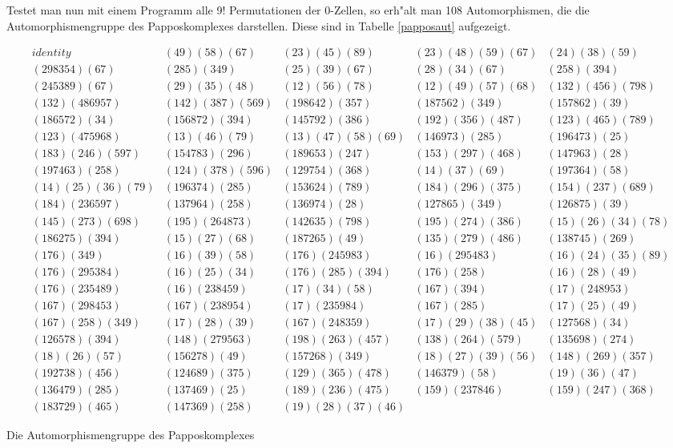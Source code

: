 Testet man nun mit einem Programm alle 9! Permutationen der 0-Zellen, so
erh"alt man 108 Automorphismen, die die Automorphismengruppe des Papposkomplexes
darstellen. Diese sind in Tabelle \ref{papposaut} aufgezeigt.

\begin{table}%
{\footnotesize
$$
\begin{array}{lllll}
identity&(49)(58)(67)&(23)(45)(89)&(23)(48)(59)(67)&(24)(38)(59)\\
(298354)(67)&(285)(349)&(25)(39)(67)&(28)(34)(67)&(258)(394)\\
(245389)(67)&(29)(35)(48)&(12)(56)(78)&(12)(49)(57)(68)&(132)(456)(798)\\
(132)(486957)&(142)(387)(569)&(198642)(357)&(187562)(349)&(157862)(39)\\
(186572)(34)&(156872)(394)&(145792)(386)&(192)(356)(487)&(123)(465)(789)\\
(123)(475968)&(13)(46)(79)&(13)(47)(58)(69)&(146973)(285)&(196473)(25)\\
(183)(246)(597)&(154783)(296)&(189653)(247)&(153)(297)(468)&(147963)(28)\\
(197463)(258)&(124)(378)(596)&(129754)(368)&(14)(37)(69)&(197364)(58)\\
(14)(25)(36)(79)&(196374)(285)&(153624)(789)&(184)(296)(375)&(154)(237)(689)\\
(184)(236597)&(137964)(258)&(136974)(28)&(127865)(349)&(126875)(39)\\
(145)(273)(698)&(195)(264873)&(142635)(798)&(195)(274)(386)&(15)(26)(34)(78)\\
(186275)(394)&(15)(27)(68)&(187265)(49)&(135)(279)(486)&(138745)(269)\\
(176)(349)&(16)(39)(58)&(176)(245983)&(16)(295483)&(16)(24)(35)(89)\\
(176)(295384)&(16)(25)(34)&(176)(285)(394)&(176)(258)&(16)(28)(49)\\
(176)(235489)&(16)(238459)&(17)(34)(58)&(167)(394)&(17)(248953)\\
(167)(298453)&(167)(238954)&(17)(235984)&(167)(285)&(17)(25)(49)\\
(167)(258)(349)&(17)(28)(39)&(167)(248359)&(17)(29)(38)(45)&(127568)(34)\\
(126578)(394)&(148)(279563)&(198)(263)(457)&(138)(264)(579)&(135698)(274)\\
(18)(26)(57)&(156278)(49)&(157268)(349)&(18)(27)(39)(56)&(148)(269)(357)\\
(192738)(456)&(124689)(375)&(129)(365)(478)&(146379)(58)&(19)(36)(47)\\
(136479)(285)&(137469)(25)&(189)(236)(475)&(159)(237846)&(159)(247)(368)\\
(183729)(465)&(147369)(258)&(19)(28)(37)(46)&&
\end{array}$$}
\caption{Die Automorphismengruppe des Papposkomplexes}
\label{papposaut}
\end{table}

